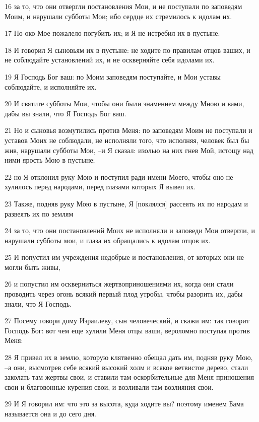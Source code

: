 \par 16 за то, что они отвергли постановления Мои, и не поступали по заповедям Моим, и нарушали субботы Мои; ибо сердце их стремилось к идолам их.
\par 17 Но око Мое пожалело погубить их; и Я не истребил их в пустыне.
\par 18 И говорил Я сыновьям их в пустыне: не ходите по правилам отцов ваших, и не соблюдайте установлений их, и не оскверняйте себя идолами их.
\par 19 Я Господь Бог ваш: по Моим заповедям поступайте, и Мои уставы соблюдайте, и исполняйте их.
\par 20 И святите субботы Мои, чтобы они были знамением между Мною и вами, дабы вы знали, что Я Господь Бог ваш.
\par 21 Но и сыновья возмутились против Меня: по заповедям Моим не поступали и уставов Моих не соблюдали, не исполняли того, что исполняя, человек был бы жив, нарушали субботы Мои, --и Я сказал: изолью на них гнев Мой, истощу над ними ярость Мою в пустыне;
\par 22 но Я отклонил руку Мою и поступил ради имени Моего, чтобы оно не хулилось перед народами, перед глазами которых Я вывел их.
\par 23 Также, подняв руку Мою в пустыне, Я [поклялся] рассеять их по народам и развеять их по землям
\par 24 за то, что они постановлений Моих не исполняли и заповеди Мои отвергли, и нарушали субботы мои, и глаза их обращались к идолам отцов их.
\par 25 И попустил им учреждения недобрые и постановления, от которых они не могли быть живы,
\par 26 и попустил им оскверниться жертвоприношениями их, когда они стали проводить через огонь всякий первый плод утробы, чтобы разорить их, дабы знали, что Я Господь.
\par 27 Посему говори дому Израилеву, сын человеческий, и скажи им: так говорит Господь Бог: вот чем еще хулили Меня отцы ваши, вероломно поступая против Меня:
\par 28 Я привел их в землю, которую клятвенно обещал дать им, подняв руку Мою, --а они, высмотрев себе всякий высокий холм и всякое ветвистое дерево, стали заколать там жертвы свои, и ставили там оскорбительные для Меня приношения свои и благовонные курения свои, и возливали там возлияния свои.
\par 29 И Я говорил им: что это за высота, куда ходите вы? поэтому именем Бама называется она и до сего дня.

